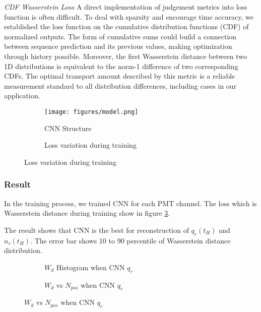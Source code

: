 \emph{CDF Wasserstein Loss}
A direct implementation of judgement metrics into loss function is often difficult. To deal with sparsity and encourage time accuracy, we established the loss function on the cumulative distribution functions (CDF) of normalized outputs. The form of cumulative sums could build a connection between sequence prediction and its previous values, making optimization through history possible. Moreover, the first Wasserstein distance between two 1D distributions is equivalent to the norm-1 difference of two corresponding CDFs. The optimal transport amount described by this metric is a reliable measurement standard to all distribution differences, including cases in our application.

\begin{figure}[H]
\begin{minipage}[b]{.3\textwidth}
\begin{figure}[H]
    \centering
    \texttt{[image: figures/model.png]}
    \caption{\label{fig:struct} CNN Structure}
\end{figure}
\end{minipage}
\begin{minipage}[b]{.7\textwidth}
\begin{figure}[H]
    \centering
    \resizebox{0.7\textwidth}{!}{}
    \caption{\label{fig:loss} Loss variation during training}
\end{figure}
\end{minipage}
\end{figure}

\subsubsection{Result}
In the training process, we trained CNN for each PMT channel. The loss which is Wasserstein distance during training show in figure \ref{fig:loss}. 

The result shows that CNN is the best for reconstruction of $q_{r}(t_{H})$ and $n_{r}(t_{H})$. The error bar shows 10 to 90 percentile of Wasserstein distance distribution. 

\begin{figure}[H]
\begin{minipage}[b]{.5\textwidth}
\begin{figure}[H]
    \centering
    \resizebox{\textwidth}{!}{}
    \caption{$W_{d}$ Histogram when CNN $q_{r}$}
\end{figure}
\end{minipage}
\begin{minipage}[b]{.5\textwidth}
\begin{figure}[H]
    \centering
    \resizebox{\textwidth}{!}{}
    \caption{$W_{d}$ vs $N_{pos}$ when CNN $q_{r}$}
\end{figure}
\end{minipage}
\end{figure}

